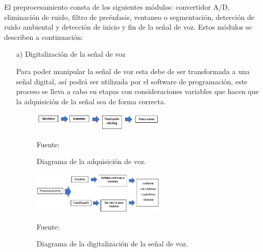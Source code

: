 \newpage
El preprocesamiento consta de los siguientes módulos: convertidor A/D, eliminación de ruido, filtro de preénfasis, ventaneo o segmentación, detección de ruido ambiental y detección de inicio y fin de la señal de voz. Estos módulos se describen a continuación:

\begin{enumerate}
\item[a)]Digitalización de la señal de voz
\par
Para poder manipular la señal de voz esta debe de ser transformada a una señal digital, así podrá ser utilizada por el software de programación, este proceso se lleva a cabo en etapas con consideraciones variables que hacen que la adquisición de la señal sea de forma correcta.

\vskip 0.5cm
\begin{figure}[ht]
\begin{center}
\includegraphics[width=0.6\textwidth]{Imagenes/Cap2/image008}
\end{center}
\begin{center}
\vskip -0.5cm
\caption{\small{Diagrama de la adquisición de voz.}}
\label{fig:figura2.8}
{\small{Fuente: \cite{eyra}}}
\end{center}
\end{figure}

\begin{figure}[ht]
\begin{center}
\includegraphics[width=0.6\textwidth]{Imagenes/Cap2/image009}
\end{center}
\begin{center}
\vskip -0.5cm
\caption{\small{Diagrama de la digitalización de la señal de voz.}}
\label{fig:figura2.9}
{\small{Fuente: \cite{eyra}}}
\end{center}
\end{figure}


\end{enumerate}
